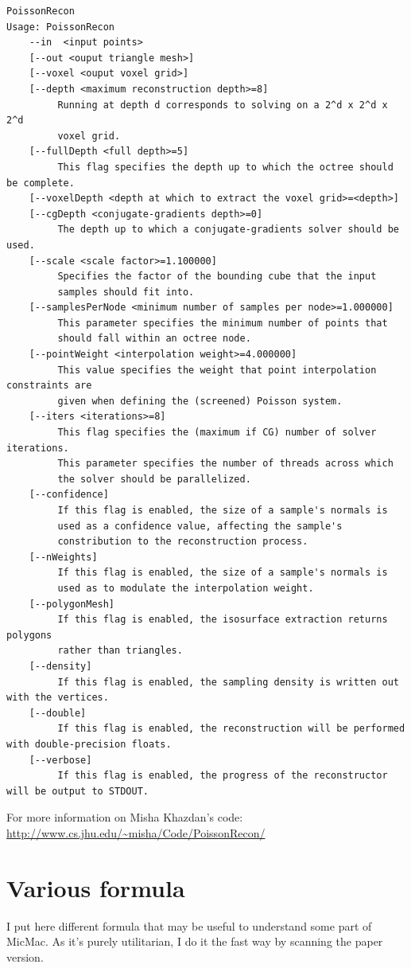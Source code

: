 \begin{verbatim}
PoissonRecon
Usage: PoissonRecon
	--in  <input points>
	[--out <ouput triangle mesh>]
	[--voxel <ouput voxel grid>]
	[--depth <maximum reconstruction depth>=8]
		 Running at depth d corresponds to solving on a 2^d x 2^d x 2^d
		 voxel grid.
	[--fullDepth <full depth>=5]
		 This flag specifies the depth up to which the octree should be complete.
	[--voxelDepth <depth at which to extract the voxel grid>=<depth>]
	[--cgDepth <conjugate-gradients depth>=0]
		 The depth up to which a conjugate-gradients solver should be used.
	[--scale <scale factor>=1.100000]
		 Specifies the factor of the bounding cube that the input
		 samples should fit into.
	[--samplesPerNode <minimum number of samples per node>=1.000000]
		 This parameter specifies the minimum number of points that
		 should fall within an octree node.
	[--pointWeight <interpolation weight>=4.000000]
		 This value specifies the weight that point interpolation constraints are
		 given when defining the (screened) Poisson system.
	[--iters <iterations>=8]
		 This flag specifies the (maximum if CG) number of solver iterations.
		 This parameter specifies the number of threads across which
		 the solver should be parallelized.
	[--confidence]
		 If this flag is enabled, the size of a sample's normals is
		 used as a confidence value, affecting the sample's
		 constribution to the reconstruction process.
	[--nWeights]
		 If this flag is enabled, the size of a sample's normals is
		 used as to modulate the interpolation weight.
	[--polygonMesh]
		 If this flag is enabled, the isosurface extraction returns polygons
		 rather than triangles.
	[--density]
		 If this flag is enabled, the sampling density is written out with the vertices.
	[--double]
		 If this flag is enabled, the reconstruction will be performed with double-precision floats.
	[--verbose]
		 If this flag is enabled, the progress of the reconstructor will be output to STDOUT.
\end{verbatim}
For more information on Misha Khazdan's code: \url{http://www.cs.jhu.edu/~misha/Code/PoissonRecon/}



\chapter{Various formula}

I put here different formula that may be useful to understand some part of MicMac. As it's purely utilitarian, I do it the fast way by
scanning the paper version.

